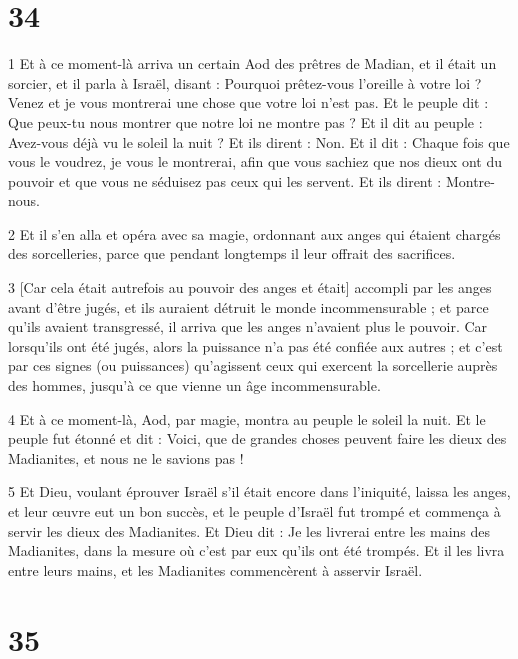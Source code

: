 \chapter{34}

\par 1 Et à ce moment-là arriva un certain Aod des prêtres de Madian, et il était un sorcier, et il parla à Israël, disant : Pourquoi prêtez-vous l'oreille à votre loi ? Venez et je vous montrerai une chose que votre loi n'est pas. Et le peuple dit : Que peux-tu nous montrer que notre loi ne montre pas ? Et il dit au peuple : Avez-vous déjà vu le soleil la nuit ? Et ils dirent : Non. Et il dit : Chaque fois que vous le voudrez, je vous le montrerai, afin que vous sachiez que nos dieux ont du pouvoir et que vous ne séduisez pas ceux qui les servent. Et ils dirent : Montre-nous.

\par 2 Et il s'en alla et opéra avec sa magie, ordonnant aux anges qui étaient chargés des sorcelleries, parce que pendant longtemps il leur offrait des sacrifices.

\par 3 [Car cela était autrefois au pouvoir des anges et était] accompli par les anges avant d'être jugés, et ils auraient détruit le monde incommensurable ; et parce qu'ils avaient transgressé, il arriva que les anges n'avaient plus le pouvoir. Car lorsqu'ils ont été jugés, alors la puissance n'a pas été confiée aux autres ; et c'est par ces signes (ou puissances) qu'agissent ceux qui exercent la sorcellerie auprès des hommes, jusqu'à ce que vienne un âge incommensurable.

\par 4 Et à ce moment-là, Aod, par magie, montra au peuple le soleil la nuit. Et le peuple fut étonné et dit : Voici, que de grandes choses peuvent faire les dieux des Madianites, et nous ne le savions pas !

\par 5 Et Dieu, voulant éprouver Israël s'il était encore dans l'iniquité, laissa les anges, et leur œuvre eut un bon succès, et le peuple d'Israël fut trompé et commença à servir les dieux des Madianites. Et Dieu dit : Je les livrerai entre les mains des Madianites, dans la mesure où c'est par eux qu'ils ont été trompés. Et il les livra entre leurs mains, et les Madianites commencèrent à asservir Israël.

\chapter{35}

